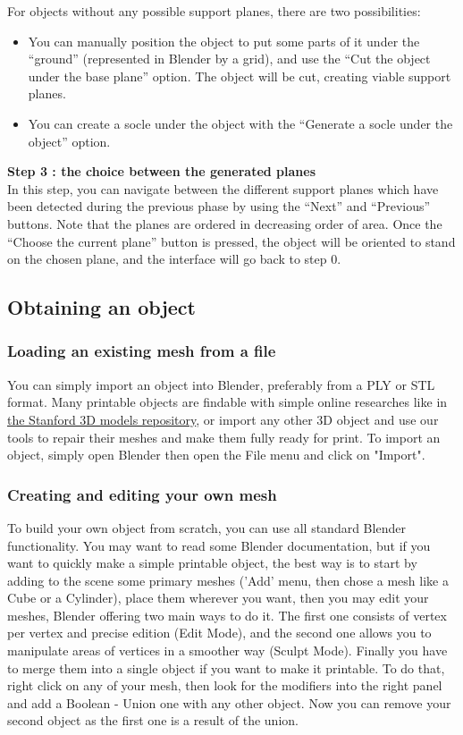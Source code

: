 \documentclass{article}
\begin{document}
For objects without any possible support planes, there are two possibilities:
\begin{itemize}
\item You can manually position the object to put some parts of it under the ``ground'' (represented in Blender by a grid), and use the ``Cut the object under the base plane'' option. The object will be cut, creating viable support planes.
\item You can create a socle under the object with the ``Generate a socle under the object'' option.
\end{itemize}

\textbf{Step 3 : the choice between the generated planes}\\ 

In this step, you can navigate between the different support planes which have been detected during the previous phase by using the ``Next'' and ``Previous'' buttons. Note that the planes are ordered in decreasing order of area. Once the ``Choose the current plane'' button is pressed, the object will be oriented to stand on the chosen plane, and the interface will go back to step 0.

\subsection{Obtaining an object}

\subsubsection{Loading an existing mesh from a file}

You can simply import an object into Blender, preferably from a PLY or STL format. Many printable objects are findable with simple online researches like in \href{http://graphics.stanford.edu/data/3Dscanrep/}{the Stanford 3D models repository}, or import any other 3D object and use our tools to repair their meshes and make them fully ready for print.
To import an object, simply open Blender then open the File menu and click on "Import".

\subsubsection{Creating and editing your own mesh}

To build your own object from scratch, you can use all standard Blender functionality. You may want to read some Blender documentation, but if you want to quickly make a simple printable object, the best way is to start by adding to the scene some primary meshes ('Add' menu, then chose a mesh like a Cube or a Cylinder), place them wherever you want, then you may edit your meshes, Blender offering two main ways to do it. The first one consists of vertex per vertex and precise edition (Edit Mode), and the second one allows you to manipulate areas of vertices in a smoother way (Sculpt Mode). Finally you have to merge them into a single object if you want to make it printable. To do that, right click on any of your mesh, then look for the modifiers into the right panel and add a Boolean - Union one with any other object. Now you can remove your second object as the first one is a result of the union.
\end{document}
